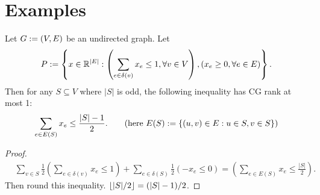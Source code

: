 \documentclass[a4paper,12pt,fleqn]{article}
\begin{document}
\section{Examples}

\begin{theorem}
Let $G := (V, E)$ be an undirected graph. Let
\[ P := \left\{x \in \mathbb{R}^{|E|}: \left(\sum_{e \in \delta(v)} x_e \le 1, \forall v \in V\right),
    (x_e \ge 0, \forall e \in E)\right\}. \]
Then for any $S \subseteq V$ where $|S|$ is odd, the following inequality has CG rank at most 1:
\[ \sum_{e \in E(S)} x_e \le \frac{|S|-1}{2}. \tag{here $E(S) \defeq \{(u, v) \in E: u \in S, v \in S\}$} \]
\end{theorem}
\begin{proof}
\begin{align*}
& \sum_{v \in S} \frac{1}{2}\left(\sum_{e \in \delta(v)} x_e \le 1\right)
+ \sum_{e \in \delta(S)} \frac{1}{2}\left(-x_{e} \le 0\right)
= \left(\sum_{e \in E(S)} x_e \le \frac{|S|}{2}\right).
\end{align*}
Then round this inequality. $\left\lfloor |S|/2 \right\rfloor = (|S|-1)/2$.
\end{proof}
\end{document}
